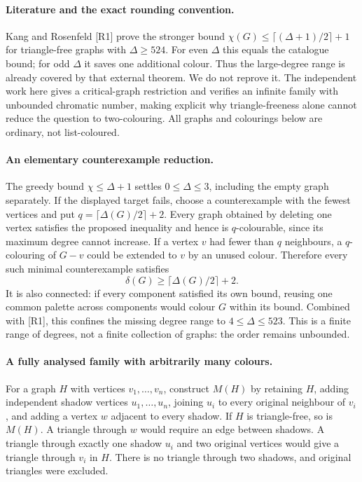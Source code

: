 \documentclass[11pt,a4paper]{article}
\begin{document}
\paragraph{Literature and the exact rounding convention.}
Kang and Rosenfeld [R1] prove the stronger bound
$\chi(G)\le\lceil(\Delta+1)/2\rceil+1$ for triangle-free graphs
with $\Delta\ge524$. For even $\Delta$ this equals the catalogue
bound; for odd $\Delta$ it saves one additional colour. Thus the
large-degree range is already covered by that external theorem. We do
not reprove it. The independent work here gives a critical-graph
restriction and verifies an infinite family with unbounded chromatic
number, making explicit why triangle-freeness alone cannot reduce the
question to two-colouring. All graphs and colourings below are ordinary,
not list-coloured.

\paragraph{An elementary counterexample reduction.}
The greedy bound $\chi\le\Delta+1$ settles $0\le\Delta\le3$,
including the empty graph separately. If the displayed target fails,
choose a counterexample with the fewest vertices and put
$q=\lceil\Delta(G)/2\rceil+2$. Every graph obtained by deleting one
vertex satisfies the proposed inequality and hence is $q$-colourable,
since its maximum degree cannot increase. If a vertex $v$ had fewer
than $q$ neighbours, a $q$-colouring of $G-v$ could be extended to
$v$ by an unused colour. Therefore every such minimal counterexample
satisfies
\[
 \delta(G)\ge\lceil\Delta(G)/2\rceil+2.
\]
It is also connected: if every component satisfied its own bound,
reusing one common palette across components would colour $G$ within
its bound. Combined with [R1], this confines the missing degree range
to $4\le\Delta\le523$. This is a finite range of degrees, not a
finite collection of graphs: the order remains unbounded.

\paragraph{A fully analysed family with arbitrarily many colours.}
For a graph $H$ with vertices $v_1,\ldots,v_n$, construct $M(H)$ by
retaining $H$, adding independent shadow vertices $u_1,\ldots,u_n$,
joining $u_i$ to every original neighbour of $v_i$, and adding a
vertex $w$ adjacent to every shadow. If $H$ is triangle-free, so
is $M(H)$. A triangle through $w$ would require an edge between
shadows. A triangle through exactly one shadow $u_i$ and two original
vertices would give a triangle through $v_i$ in $H$. There is no
triangle through two shadows, and original triangles were excluded.
\end{document}
